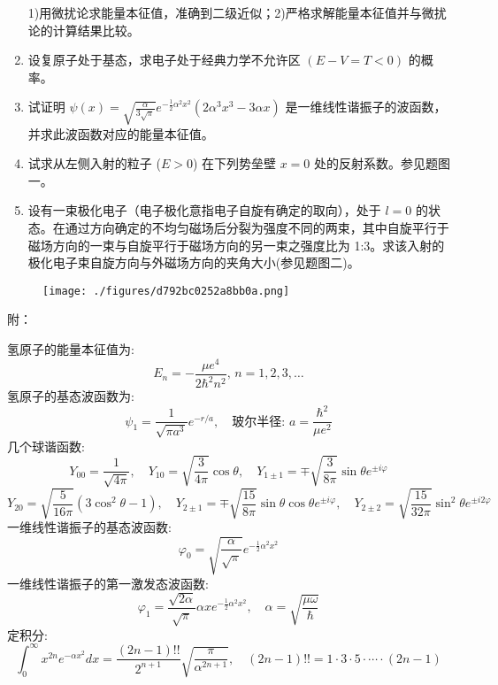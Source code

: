 \begin{enumerate}
    1)用微扰论求能量本征值，准确到二级近似；2)严格求解能量本征值并与微扰论的计算结果比较。\\
    \item 设复原子处于基态，求电子处于经典力学不允许区 $(E - V = T < 0)$ 的概率。
    \item 试证明 $\psi(x) = \sqrt{\frac{\alpha}{3\sqrt{\pi}}} e^{-\frac{1}{2}\alpha^2 x^2} (2\alpha^3 x^3 - 3\alpha x)$ 是一维线性谐振子的波函数，并求此波函数对应的能量本征值。
    \item 试求从左侧入射的粒子 ($E > 0$) 在下列势垒壁 $x = 0$ 处的反射系数。参见题图一。
    \item 设有一束极化电子（电子极化意指电子自旋有确定的取向），处于 $l = 0$ 的状态。在通过方向确定的不均匀磁场后分裂为强度不同的两束，其中自旋平行于磁场方向的一束与自旋平行于磁场方向的另一束之强度比为 1:3。求该入射的极化电子束自旋方向与外磁场方向的夹角大小(参见题图二)。
\end{enumerate}
\begin{figure}[ht]
\centering
\texttt{[image: ./figures/d792bc0252a8bb0a.png]}
\caption{} \label{fig_NJUST4_1}
\end{figure}
附：

氢原子的能量本征值为:
\[E_n = -\frac{\mu e^4}{2\hbar^2 n^2}, \, n=1,2,3,\ldots~\]
氢原子的基态波函数为:\[\psi_1 = \frac{1}{\sqrt{\pi a^3}} e^{-r/a}, \quad \text{玻尔半径: } a = \frac{\hbar^2}{\mu e^2}~\]
几个球谐函数:\[Y_{00} = \frac{1}{\sqrt{4\pi}}, \quad Y_{10} = \sqrt{\frac{3}{4\pi}} \cos \theta, \quad Y_{1\pm1} = \mp \sqrt{\frac{3}{8\pi}} \sin \theta e^{\pm i\varphi}~\]
\[Y_{20} = \sqrt{\frac{5}{16\pi}} (3\cos^2 \theta - 1), \quad Y_{2\pm1} = \mp \sqrt{\frac{15}{8\pi}} \sin \theta \cos \theta e^{\pm i\varphi}, \quad Y_{2\pm2} = \sqrt{\frac{15}{32\pi}} \sin^2 \theta e^{\pm i 2\varphi}~\]
一维线性谐振子的基态波函数:\[\varphi_0 = \sqrt{\frac{\alpha}{\sqrt{\pi}}} e^{-\frac{1}{2} \alpha^2 x^2}~\]
一维线性谐振子的第一激发态波函数:\[\varphi_1 = \frac{\sqrt{2\alpha}}{\sqrt{\pi}} \alpha x e^{-\frac{1}{2} \alpha^2 x^2}, \quad \alpha = \sqrt{\frac{\mu \omega}{\hbar}}~\]
定积分:\[\int_{0}^{\infty} x^{2n} e^{-\alpha x^2} dx = \frac{(2n-1)!!}{2^{n+1}} \sqrt{\frac{\pi}{\alpha^{2n+1}}}, \quad (2n-1)!! = 1 \cdot 3 \cdot 5 \cdot \cdots \cdot (2n-1)~\]